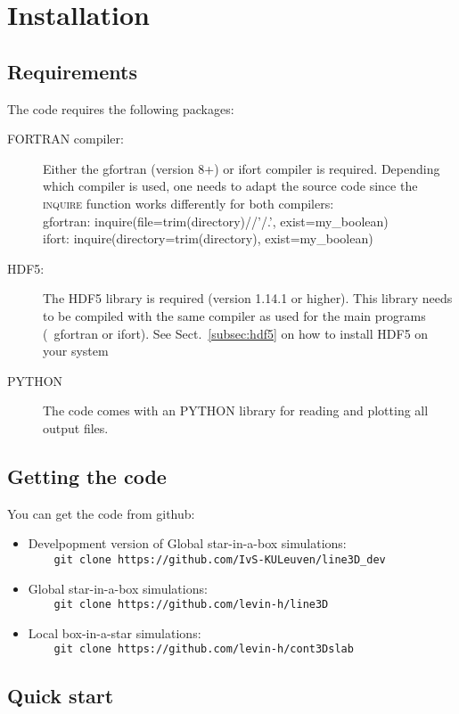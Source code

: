 \documentclass[10pt,a4paper]{article}
\begin{document}
\section{Installation}
\subsection{Requirements}
The code requires the following packages:
\begin{description}
\item[\textsc{FORTRAN} compiler:] Either the gfortran (version  8+) or ifort compiler is required. Depending which compiler is used, one needs to adapt the source code since the \textsc{inquire} function works differently for both compilers:
  \\
  gfortran: inquire(file=trim(directory)//'/.', exist=my\_boolean)
  \\
  ifort: inquire(directory=trim(directory), exist=my\_boolean)
\item[\textsc{HDF5}:] The HDF5 library is required (version 1.14.1 or higher). This library needs to be compiled with the same compiler as used for the main programs (\ie~gfortran or ifort). See Sect.~\ref{subsec:hdf5} on how to install HDF5 on your system
  \item[\textsc{PYTHON}] The code comes with an PYTHON library for reading and plotting all output files.
\end{description}  
\subsection{Getting the code}
You can get the code from github:
\begin{itemize}
  \item Develpopment version of Global star-in-a-box simulations:\\
    \verb|    git clone https://github.com/IvS-KULeuven/line3D_dev|
  \item Global star-in-a-box simulations:\\
    \verb|    git clone https://github.com/levin-h/line3D|
  \item Local box-in-a-star simulations:\\
    \verb|    git clone https://github.com/levin-h/cont3Dslab|
\end{itemize}
%
%
%
\subsection{Quick start}
\end{document}
